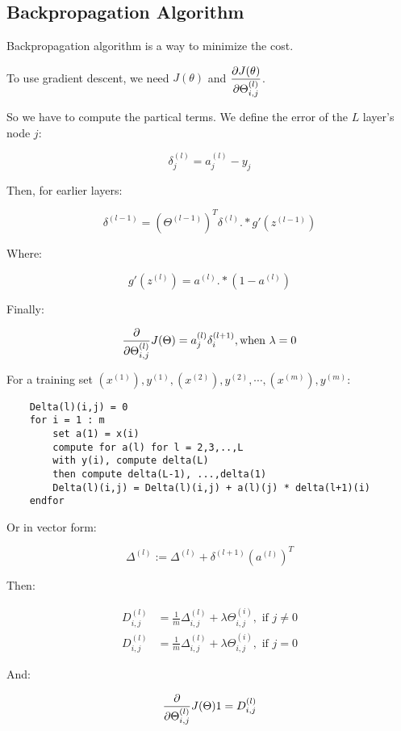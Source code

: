 \documentclass[en,11pt,english,black,simple]{../elegantbook}
\begin{document}
\subsection{Backpropagation Algorithm}

Backpropagation algorithm is a way to minimize the cost.

To use gradient descent, we need \(J(\theta)\)
 and \(\dfrac{\partial{}J(\theta)}{\partial{}\Theta_{i,j}^{(l)}}\).

So we have to compute the partical terms. We define the error of the \(L\) layer's node \(j\):

\[\delta_j^{(l)} = a^{(l)}_j - y_j\]

Then, for earlier layers:


\[\delta^{(l-1)} = (\Theta^{(l-1)})^T \delta^{(l)} .* g'(z^{(l-1)})\]

Where: 

\[g'(z^{(l)}) = a^{(l)} .* (1-a^{(l)})\]

Finally:

\[\frac{\partial{}}{\partial{}\Theta_{i,j}^{(l)}} J(\Theta) = a_j^{(l)} \delta_i^{(l+1)}, \text{when } \lambda = 0\]

For a training set  \({(x^{(1)}), y^{(1)}},{(x^{(2)}), y^{(2)}},\cdots,{(x^{(m)}), y^{(m)}}\):

\begin{lstlisting}
    Delta(l)(i,j) = 0
    for i = 1 : m
        set a(1) = x(i)
        compute for a(l) for l = 2,3,..,L
        with y(i), compute delta(L)
        then compute delta(L-1), ...,delta(1)
        Delta(l)(i,j) = Delta(l)(i,j) + a(l)(j) * delta(l+1)(i)
    endfor
\end{lstlisting}

Or in vector form: 

\[\Delta^{(l)} := \Delta^{(l)} + \delta^{(l+1)} (a^{(l)})^T\]



Then:

\[
\begin{aligned}
    D_{i,j}^{(l)} &= \frac{1}{m} \Delta_{i,j}^{(l)} + \lambda \Theta_{i,j}^{(i)}, \text{ if } j \neq 0\\
    D_{i,j}^{(l)} &= \frac{1}{m} \Delta_{i,j}^{(l)} + \lambda \Theta_{i,j}^{(i)}, \text{ if } j = 0
\end{aligned}
\]

And: 

\[\\
\dfrac{\partial{}}{\partial{}\Theta_{i,j}^{(l)}}J(\Theta) 1= D_{i,j} ^{(l)}\]
\end{document}

